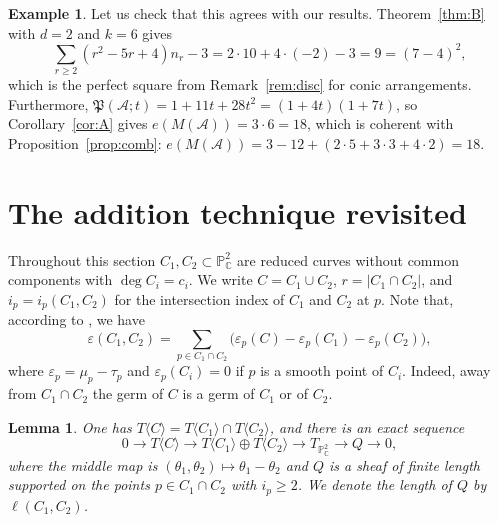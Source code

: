 \documentclass[11pt]{amsart}
\newtheorem{lemma}[theorem]{Lemma}
\theoremstyle{definition}
\newtheorem{example}[theorem]{Example}
\numberwithin{equation}{section}
\newcommand{\PP}{\mathbb{P}}
\newcommand{\CC}{\mathbb{C}}
\newcommand{\gadd}[1]{#1}
\begin{document}
\begin{example}
Let us check that this agrees with our results. Theorem~\gadd{\ref{thm:B}} with $d=2$ and $k=6$ gives
\[
\sum_{r\geq 2}(r^2-5r+4)n_r-3=2\cdot 10+4\cdot(-2)-3=9=(7-4)^2,
\]
which is the perfect square from Remark~\gadd{\ref{rem:disc} for conic arrangements}. Furthermore,
$\mathfrak{P}(\mathcal{A};t)=1+11t+28t^2=(1+4t)(1+7t)$, so Corollary~\gadd{\ref{cor:A}} gives
$e(M(\mathcal{A}))=3\cdot 6=18$, which is coherent with Proposition~\gadd{\ref{prop:comb}}:
$e(M(\mathcal{A}))=3-12+(2\cdot 5+3\cdot 3+4\cdot 2)=18$.
\end{example}
\section{The addition technique revisited}\label{sec:C}

Throughout this section $C_1,C_2\subset\PP^2_\CC$ are reduced curves without common components with $\deg C_i=c_i$.
We write $C=C_1\cup C_2$, $r=|C_1\cap C_2|$, and $i_p=i_p(C_1,C_2)$ for the intersection index of $C_1$ and $C_2$ at $p$.
Note that, according to \cite{Di24}, we have
\[
\varepsilon(C_1,C_2)=\sum_{p\in C_1\cap C_2}\bigl(\varepsilon_p(C)-\varepsilon_p(C_1)-\varepsilon_p(C_2)\bigr),
\]
where $\varepsilon_p=\mu_p-\tau_p$ and $\varepsilon_p(C_i)=0$ if $p$ is a smooth point of $C_i$.
Indeed, away from $C_1\cap C_2$ the germ of $C$ is a germ of $C_1$ or of $C_2$.

\begin{lemma}\label{lem:add}
One has $T\langle C\rangle=T\langle C_1\rangle\cap T\langle C_2\rangle$, and there is an exact sequence
\begin{equation}\label{eq:add}
0\to T\langle C\rangle\to T\langle C_1\rangle\oplus T\langle C_2\rangle\to T_{\PP^2_\CC}\to Q\to0,
\end{equation}
where the middle map is $(\theta_1,\theta_2)\mapsto\theta_1-\theta_2$ and $Q$ is a sheaf of finite length supported on the points $p\in C_1\cap C_2$ with $i_p\ge2$.
We denote the length of $Q$ by $\ell(C_1,C_2)$.
\end{lemma}
\end{document}
